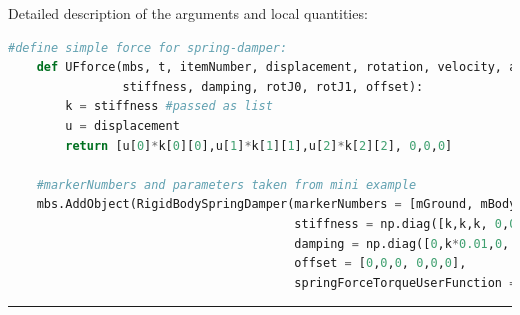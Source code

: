 	Detailed description of the arguments and local quantities:
    \finishTable
    \userFunctionExample{}
    \pythonstyle
    \begin{lstlisting}[language=Python]
    #define simple force for spring-damper:
    def UFforce(mbs, t, itemNumber, displacement, rotation, velocity, angularVelocity, 
                stiffness, damping, rotJ0, rotJ1, offset): 
        k = stiffness #passed as list
        u = displacement
        return [u[0]*k[0][0],u[1]*k[1][1],u[2]*k[2][2], 0,0,0]
    
    #markerNumbers and parameters taken from mini example
    mbs.AddObject(RigidBodySpringDamper(markerNumbers = [mGround, mBody], 
                                        stiffness = np.diag([k,k,k, 0,0,0]), 
                                        damping = np.diag([0,k*0.01,0, 0,0,0]), 
                                        offset = [0,0,0, 0,0,0],
                                        springForceTorqueUserFunction = UFforce))
    \end{lstlisting}
\vspace{6pt}\par\noindent\rule{\textwidth}{0.4pt}
\label{miniExample_ObjectConnectorRigidBodySpringDamper}
\pythonstyle
